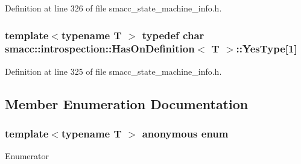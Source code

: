 Definition at line 326 of file smacc\+\_\+state\+\_\+machine\+\_\+info.\+h.

\subsubsection[{\texorpdfstring{Yes\+Type}{YesType}}]{\setlength{\rightskip}{0pt plus 5cm}template$<$typename T $>$ typedef char {\bf smacc\+::introspection\+::\+Has\+On\+Definition}$<$ T $>$\+::Yes\+Type\mbox{[}1\mbox{]}\hspace{0.3cm}{\ttfamily [private]}}\hypertarget{classsmacc_1_1introspection_1_1HasOnDefinition_ad18cda8f47c5a0e9660b7c7ca54d98c7}{}\label{classsmacc_1_1introspection_1_1HasOnDefinition_ad18cda8f47c5a0e9660b7c7ca54d98c7}


Definition at line 325 of file smacc\+\_\+state\+\_\+machine\+\_\+info.\+h.



\subsection{Member Enumeration Documentation}
\subsubsection[{\texorpdfstring{anonymous enum}{anonymous enum}}]{\setlength{\rightskip}{0pt plus 5cm}template$<$typename T $>$ anonymous enum}\hypertarget{classsmacc_1_1introspection_1_1HasOnDefinition_ab40a368fd2564562bf0107984f5f197d}{}\label{classsmacc_1_1introspection_1_1HasOnDefinition_ab40a368fd2564562bf0107984f5f197d}
\begin{Desc}
\item[Enumerator]\par
\begin{description}
\item[{\em 
value\hypertarget{classsmacc_1_1introspection_1_1HasOnDefinition_ab40a368fd2564562bf0107984f5f197da2c667ca4893ef31062bc9864e4d06ab2}{}\label{classsmacc_1_1introspection_1_1HasOnDefinition_ab40a368fd2564562bf0107984f5f197da2c667ca4893ef31062bc9864e4d06ab2}
}]\end{description}
\end{Desc}


